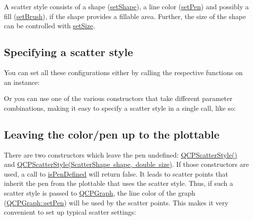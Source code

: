 A scatter style consists of a shape (\mbox{\hyperlink{class_q_c_p_scatter_style_a7c641c4d4c6d29cb705d3887cfce91c1}{set\+Shape}}), a line color (\mbox{\hyperlink{class_q_c_p_scatter_style_a761f1f229cc0ca4703e1e2b89f6dd1ba}{set\+Pen}}) and possibly a fill (\mbox{\hyperlink{class_q_c_p_scatter_style_a74d692aaeb8d4b36d6f7d510e44264b1}{set\+Brush}}), if the shape provides a fillable area. Further, the size of the shape can be controlled with \mbox{\hyperlink{class_q_c_p_scatter_style_aaefdd031052892c4136129db68596e0f}{set\+Size}}.\hypertarget{class_q_c_p_scatter_style_QCPScatterStyle-defining}{}\subsection{Specifying a scatter style}\label{class_q_c_p_scatter_style_QCPScatterStyle-defining}
You can set all these configurations either by calling the respective functions on an instance\+: 
\begin{DoxyCodeInclude}
\end{DoxyCodeInclude}
 Or you can use one of the various constructors that take different parameter combinations, making it easy to specify a scatter style in a single call, like so\+: 
\begin{DoxyCodeInclude}
\end{DoxyCodeInclude}
 \hypertarget{class_q_c_p_scatter_style_QCPScatterStyle-undefinedpen}{}\subsection{Leaving the color/pen up to the plottable}\label{class_q_c_p_scatter_style_QCPScatterStyle-undefinedpen}
There are two constructors which leave the pen undefined\+: \mbox{\hyperlink{class_q_c_p_scatter_style_a8836018d9ad83ccd8870de8315c1be73}{Q\+C\+P\+Scatter\+Style()}} and \mbox{\hyperlink{class_q_c_p_scatter_style_a003d92f74f4561eda111862eadd62f28}{Q\+C\+P\+Scatter\+Style(\+Scatter\+Shape shape, double size)}}. If those constructors are used, a call to \mbox{\hyperlink{class_q_c_p_scatter_style_a47077eb6450fe9a788f833e4ec1b1d5a}{is\+Pen\+Defined}} will return false. It leads to scatter points that inherit the pen from the plottable that uses the scatter style. Thus, if such a scatter style is passed to \mbox{\hyperlink{class_q_c_p_graph}{Q\+C\+P\+Graph}}, the line color of the graph (\mbox{\hyperlink{class_q_c_p_abstract_plottable_ab74b09ae4c0e7e13142fe4b5bf46cac7}{Q\+C\+P\+Graph\+::set\+Pen}}) will be used by the scatter points. This makes it very convenient to set up typical scatter settings\+:


